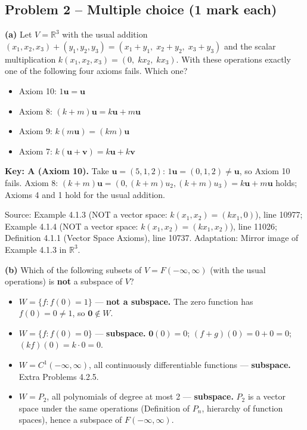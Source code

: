 \documentclass[11pt,a4paper]{article}
\newcommand{\Src}[1]{{\footnotesize\color{black!65}Source: #1}}
\begin{document}
\subsection*{Problem 2 -- Multiple choice (1 mark each)}
\textbf{(a)} Let $V=\mathbb{R}^3$ with the usual addition $(x_1,x_2,x_3)+(y_1,y_2,y_3)=(x_1+y_1,\;x_2+y_2,\;x_3+y_3)$ and the scalar multiplication $k(x_1,x_2,x_3)=(0,\;kx_2,\;kx_3)$. With these operations exactly one of the following four axioms fails. Which one?\par
\begin{itemize}[leftmargin=8mm,itemsep=0pt]\item[A$^{\ast}$] Axiom 10: $1\mathbf{u}=\mathbf{u}$\item[B] Axiom 8: $(k+m)\mathbf{u}=k\mathbf{u}+m\mathbf{u}$\item[C] Axiom 9: $k(m\mathbf{u})=(km)\mathbf{u}$\item[D] Axiom 7: $k(\mathbf{u}+\mathbf{v})=k\mathbf{u}+k\mathbf{v}$\end{itemize}
\textbf{Key: A (Axiom 10).} Take $\mathbf{u}=(5,1,2)$: $1\mathbf{u}=(0,1,2)\neq\mathbf{u}$, so Axiom 10 fails. Axiom 8: $(k+m)\mathbf{u}=(0,(k+m)u_2,(k+m)u_3)=k\mathbf{u}+m\mathbf{u}$ holds; Axioms 4 and 1 hold for the usual addition.\par
\Src{Example 4.1.3 (NOT a vector space: $k(x_1,x_2)=(kx_1,0)$), line 10977; Example 4.1.4 (NOT a vector space: $k(x_1,x_2)=(kx_1,x_2)$), line 11026; Definition 4.1.1 (Vector Space Axioms), line 10737. Adaptation: Mirror image of Example 4.1.3 in $\mathbb{R}^3$.}\par
{}\textbf{(b)} Which of the following subsets of $V=F(-\infty,\infty)$ (with the usual operations) is \textbf{not} a subspace of $V$?\par
\begin{itemize}[leftmargin=8mm,itemsep=0pt]\item[A$^{\ast}$] $W=\{f : f(0)=1\}$ --- \textbf{not a subspace.} The zero function has $f(0)=0\neq1$, so $\mathbf{0}\notin W$.\item[B] $W=\{f : f(0)=0\}$ --- \textbf{subspace.} $\mathbf{0}(0)=0$; $(f+g)(0)=0+0=0$; $(kf)(0)=k\cdot0=0$.\item[C] $W=C^1(-\infty,\infty)$, all continuously differentiable functions --- \textbf{subspace.} Extra Problems 4.2.5.\item[D] $W=P_2$, all polynomials of degree at most 2 --- \textbf{subspace.} $P_2$ is a vector space under the same operations (Definition of $P_n$, hierarchy of function spaces), hence a subspace of $F(-\infty,\infty)$.\end{itemize}
\end{document}
